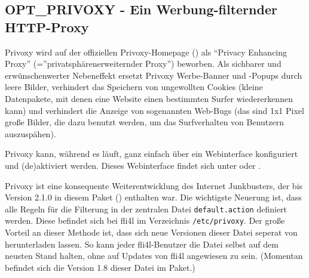 \subsection{OPT\_PRIVOXY - Ein Werbung-filternder HTTP-Proxy}

    Privoxy wird auf der offiziellen Privoxy-Homepage
()
    als ``Privacy Enhancing Proxy'' (=''privatsphärenerweiternder Proxy'')
beworben.
    Als sichbarer und erwünschenwerter Nebeneffekt ersetzt Privoxy Werbe-Banner
und
    -Popups durch leere Bilder, verhindert das Speichern von ungewollten Cookies
    (kleine Datenpakete, mit denen eine Website einen bestimmten Surfer
wiedererkennen
    kann) und verhindert die Anzeige von sogenannten Web-Bugs (das sind 1x1
Pixel große
    Bilder, die dazu benutzt werden, um das Surfverhalten von Benutzern
auszuspähen).

    Privoxy kann, während es läuft, ganz einfach über ein Webinterface
konfiguriert
    und (de)ak\-ti\-viert werden. Dieses Webinterface findet sich unter
     oder .

    Privoxy ist eine konsequente Weiterentwicklung des Internet Junkbusters, der
    bis Version 2.1.0 in diesem Paket ()
enthalten
    war.
    Die wichtigste Neuerung ist, dass alle Regeln für die Filterung in der
zentralen
    Datei \texttt{default.action} definiert werden. Diese befindet sich bei fli4l
im
    Verzeichnis \texttt{/etc/privoxy}. Der große Vorteil an dieser Methode ist,
dass
    sich neue Versionen dieser Datei seperat von \\
    herunterladen lassen. So kann jeder fli4l-Benutzer die Datei selbst auf dem
    neusten Stand halten, ohne auf Updates von fli4l angewiesen zu sein.
(Momentan
    befindet sich die Version 1.8 dieser Datei im Paket.)

